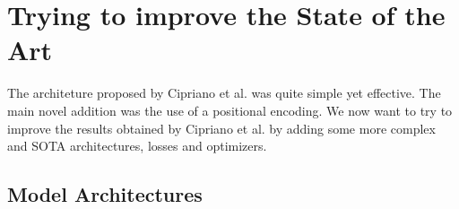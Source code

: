 
\chapter{Trying to improve the State of the Art}

\label{chp:refwork}

\def\:{\hskip0pt} %
The architeture proposed by Cipriano et al. was quite simple yet effective. The
main novel addition was the use of a positional encoding. We now want to try to
improve the results obtained by Cipriano et al. by adding some more complex
and SOTA architectures, losses and optimizers.

\section{Model Architectures}

